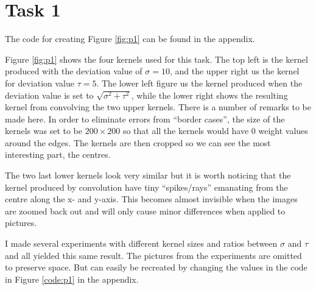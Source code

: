 \section{Task 1}
The code for creating Figure \ref{fig:p1} can be found in the appendix.


Figure \ref{fig:p1} shows the four kernels used for this task. The top left is the kernel produced
with the deviation value of $\sigma = 10$, and the upper right us the kernel for deviation value
$\tau = 5$. The lower left figure us the kernel produced when the deviation value is set to
$\sqrt{\sigma^2 + \tau^2}$, while the lower right shows the resulting kernel from convolving the
two upper kernels.
There is a number of remarks to be made here. In order to eliminate errors from ``border cases'',
the size of the kernels was set to be $200\times 200$ so that all the kernels would have 0 weight
values around the edges. The kernels are then cropped so we can see the most interesting part, the
centres.

The two last lower kernels look very similar but it is worth noticing that the kernel produced by
convolution have tiny ``spikes/rays'' emanating from the centre along the x- and y-axis. This
becomes almost invisible when the images are zoomed back out and will only cause minor differences
when applied to pictures.

I made several experiments with different kernel sizes and ratios between $\sigma$ and $\tau$ and
all yielded this same result. The pictures from the experiments are omitted to preserve space. But
can easily be recreated by changing the values in the code in Figure \ref{code:p1} in the appendix.
